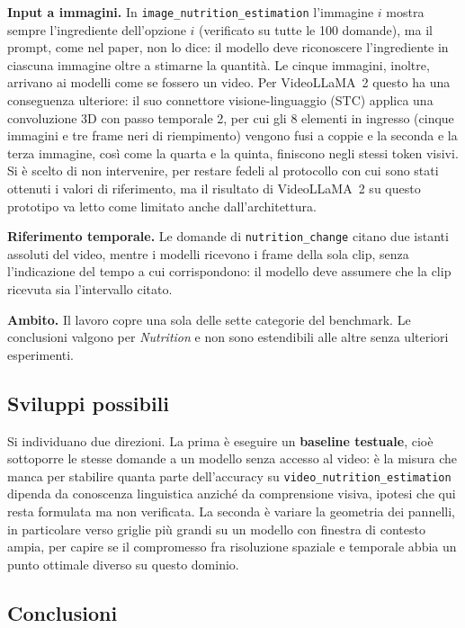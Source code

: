 \documentclass{article}
\begin{document}
\textbf{Input a immagini.} In \texttt{image\_nutrition\_estimation} l'immagine
$i$ mostra sempre l'ingrediente dell'opzione $i$ (verificato su tutte le 100
domande), ma il prompt, come nel paper, non lo dice: il modello deve riconoscere
l'ingrediente in ciascuna immagine oltre a stimarne la quantità. Le cinque
immagini, inoltre, arrivano ai modelli come se fossero un video. Per
VideoLLaMA~2 questo ha una conseguenza ulteriore: il suo connettore
visione-linguaggio (STC) applica una convoluzione 3D con passo temporale 2, per
cui gli 8 elementi in ingresso (cinque immagini e tre frame neri di
riempimento) vengono fusi a coppie e la seconda e la terza immagine, così come la
quarta e la quinta, finiscono negli stessi token visivi. Si è scelto di non
intervenire, per restare fedeli al protocollo con cui sono stati ottenuti i
valori di riferimento, ma il risultato di VideoLLaMA~2 su questo prototipo va
letto come limitato anche dall'architettura.

\textbf{Riferimento temporale.} Le domande di \texttt{nutrition\_change} citano
due istanti assoluti del video, mentre i modelli ricevono i frame della sola
clip, senza l'indicazione del tempo a cui corrispondono: il modello deve
assumere che la clip ricevuta sia l'intervallo citato.

\textbf{Ambito.} Il lavoro copre una sola delle sette categorie del benchmark.
Le conclusioni valgono per \emph{Nutrition} e non sono estendibili alle altre
senza ulteriori esperimenti.

\subsection{Sviluppi possibili}

Si individuano due direzioni. La prima è
eseguire un \textbf{baseline testuale}, cioè sottoporre le stesse domande a un
modello senza accesso al video: è la misura che manca per stabilire quanta parte
dell'accuracy su \texttt{video\_nutrition\_estimation} dipenda da conoscenza
linguistica anziché da comprensione visiva, ipotesi che qui resta formulata ma
non verificata. La seconda è variare la geometria dei pannelli, in particolare
verso griglie più grandi su un modello con finestra di contesto ampia, per capire
se il compromesso fra risoluzione spaziale e temporale abbia un punto ottimale
diverso su questo dominio.

\subsection{Conclusioni}
\end{document}
